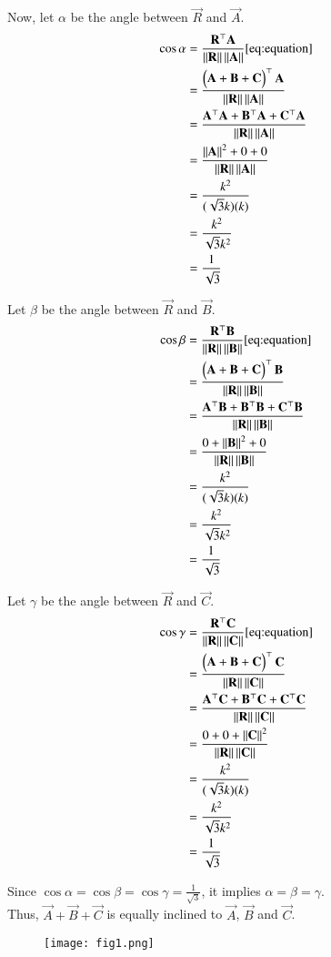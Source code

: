 \documentclass[journal]{IEEEtran}
\begin{document}
Now, let $\alpha$ be the angle between $\vec{R}$ and $\vec{A}$.
\begin{align}
\cos \alpha &= \frac{\mathbf{R}^\top \mathbf{A}}{\left\lVert\mathbf{R}\right\rVert \left\lVert\mathbf{A}\right\rVert}   \eqref{eq:equation}\\
&= \frac{\begin{pmatrix}\mathbf{A} + \mathbf{B} + \mathbf{C}\end{pmatrix}^\top \mathbf{A}}{\left\lVert\mathbf{R}\right\rVert \left\lVert\mathbf{A}\right\rVert} \\
&= \frac{\mathbf{A}^\top \mathbf{A} + \mathbf{B}^\top \mathbf{A} + \mathbf{C}^\top \mathbf{A}}{\left\lVert\mathbf{R}\right\rVert \left\lVert\mathbf{A}\right\rVert} \\
&= \frac{\left\lVert\mathbf{A}\right\rVert^2 + 0 + 0}{\left\lVert\mathbf{R}\right\rVert \left\lVert\mathbf{A}\right\rVert} \\
&= \frac{k^2}{(\sqrt{3}k)(k)} \\
&= \frac{k^2}{\sqrt{3}k^2} \\
&= \frac{1}{\sqrt{3}}
\end{align}

Let $\beta$ be the angle between $\vec{R}$ and $\vec{B}$.
\begin{align}
\cos \beta &= \frac{\mathbf{R}^\top \mathbf{B}}{\left\lVert\mathbf{R}\right\rVert \left\lVert\mathbf{B}\right\rVert}   \eqref{eq:equation} \\
&= \frac{\begin{pmatrix}\mathbf{A} + \mathbf{B} + \mathbf{C}\end{pmatrix}^\top \mathbf{B}}{\left\lVert\mathbf{R}\right\rVert \left\lVert\mathbf{B}\right\rVert} \\
&= \frac{\mathbf{A}^\top \mathbf{B} + \mathbf{B}^\top \mathbf{B} + \mathbf{C}^\top \mathbf{B}}{\left\lVert\mathbf{R}\right\rVert \left\lVert\mathbf{B}\right\rVert} \\
&= \frac{0 + \left\lVert\mathbf{B}\right\rVert^2 + 0}{\left\lVert\mathbf{R}\right\rVert \left\lVert\mathbf{B}\right\rVert} \\
&= \frac{k^2}{(\sqrt{3}k)(k)} \\
&= \frac{k^2}{\sqrt{3}k^2} \\
&= \frac{1}{\sqrt{3}}
\end{align}

Let $\gamma$ be the angle between $\vec{R}$ and $\vec{C}$.
\begin{align}
\cos \gamma &= \frac{\mathbf{R}^\top \mathbf{C}}{\left\lVert\mathbf{R}\right\rVert \left\lVert\mathbf{C}\right\rVert}   \eqref{eq:equation}\\
&= \frac{\begin{pmatrix}\mathbf{A} + \mathbf{B} + \mathbf{C}\end{pmatrix}^\top \mathbf{C}}{\left\lVert\mathbf{R}\right\rVert \left\lVert\mathbf{C}\right\rVert} \\
&= \frac{\mathbf{A}^\top \mathbf{C} + \mathbf{B}^\top \mathbf{C} + \mathbf{C}^\top \mathbf{C}}{\left\lVert\mathbf{R}\right\rVert \left\lVert\mathbf{C}\right\rVert} \\
&= \frac{0 + 0 + \left\lVert\mathbf{C}\right\rVert^2}{\left\lVert\mathbf{R}\right\rVert \left\lVert\mathbf{C}\right\rVert} \\
&= \frac{k^2}{(\sqrt{3}k)(k)} \\
&= \frac{k^2}{\sqrt{3}k^2} \\
&= \frac{1}{\sqrt{3}}
\end{align}

Since $\cos \alpha = \cos \beta = \cos \gamma = \frac{1}{\sqrt{3}}$, it implies $\alpha = \beta = \gamma$.\\

Thus, $\vec{A} + \vec{B} + \vec{C}$ is equally inclined to $\vec{A}$, $\vec{B}$ and $\vec{C}$.


\begin{figure}[H]
\centering
\texttt{[image: fig1.png]}
\caption{}
\label{fig:1}
\end{figure}
\end{document}
